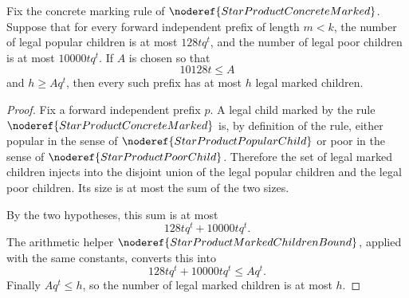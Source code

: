 \begin{helper}
Fix the concrete marking rule of \(\noderef{StarProductConcreteMarked}\).
Suppose that for every forward independent prefix of length \(m<k\), the
number of legal popular children is at most \(128tq^t\), and the number of
legal poor children is at most \(10000tq^t\).  If \(A\) is chosen so that
\[
  10128t\le A
\]
and \(h\ge Aq^t\), then every such prefix has at most \(h\) legal marked
children.
\end{helper}
\begin{proof}
Fix a forward independent prefix \(p\).  A legal child marked by the rule
\(\noderef{StarProductConcreteMarked}\) is, by definition of the rule,
either popular in the sense of \(\noderef{StarProductPopularChild}\) or poor
in the sense of \(\noderef{StarProductPoorChild}\).  Therefore the set of
legal marked children injects into the disjoint union of the legal popular
children and the legal poor children.  Its size is at most the sum of the
two sizes.

By the two hypotheses, this sum is at most
\[
  128tq^t+10000tq^t.
\]
The arithmetic helper \(\noderef{StarProductMarkedChildrenBound}\), applied
with the same constants, converts this into
\[
  128tq^t+10000tq^t\le Aq^t.
\]
Finally \(Aq^t\le h\), so the number of legal marked children is at most
\(h\).
\end{proof}
